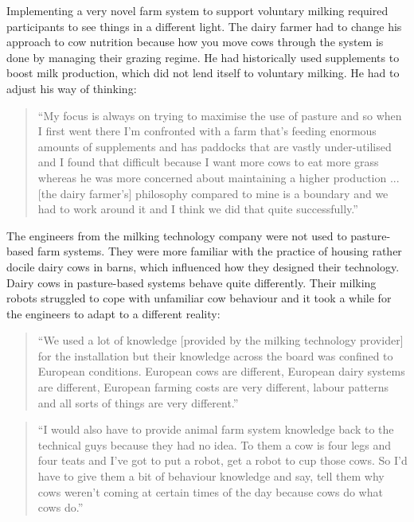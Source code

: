Implementing a very novel farm system to support voluntary milking required participants to see things in a different light. The dairy farmer had to change his approach to cow nutrition because how you move cows through the system is done by managing their grazing regime. He had historically used supplements to boost milk production, which did not lend itself to voluntary milking. He had to adjust his way of thinking:

\begin{quote}
\small
\enquote{My focus is always on trying to maximise the use of pasture and so when I first went there I'm confronted with a farm that's feeding enormous amounts of supplements and has paddocks that are vastly under-utilised and I found that difficult because I want more cows to eat more grass whereas he was more concerned about maintaining a higher production ... [the dairy farmer's] philosophy compared to mine is a boundary and we had to work around it and I think we did that quite successfully.} \\
\end{quote}

The engineers from the milking technology company were not used to pasture-based farm systems. They were more familiar with the practice of housing rather docile dairy cows in barns, which influenced how they designed their technology. Dairy cows in pasture-based systems behave quite differently. Their milking robots struggled to cope with unfamiliar cow behaviour and it took a while for the engineers to adapt to a different reality:

 \begin{quote}
\small
\enquote{We used a lot of knowledge [provided by the milking technology provider] for the installation but their knowledge across the board was confined to European conditions. European cows are different, European dairy systems are different, European farming costs are very different, labour patterns and all sorts of things are very different.} \\
\end{quote}

\begin{quote}
\small
\enquote{I would also have to provide animal farm system knowledge back to the technical guys because they had no idea. To them a cow is four legs and four teats and I've got to put a robot, get a robot to cup those cows.  So I'd have to give them a bit of behaviour knowledge and say, tell them why cows weren't coming at certain times of the day because cows do what cows do.} \\
\end{quote}

